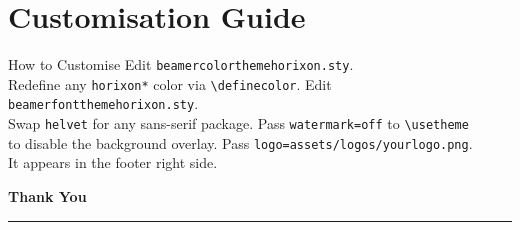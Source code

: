 \documentclass[aspectratio=169]{beamer}
\begin{document}
\horixonshowsepline

\section{Customisation Guide}

\horixonhidefooter

\begin{frame}{How to Customise}
  \columnsbegin[t]
        Edit \texttt{beamercolorthemehorixon.sty}.\\
        Redefine any \texttt{horixon*} color via \texttt{\textbackslash definecolor}.
      \blockend
        Edit \texttt{beamerfontthemehorixon.sty}.\\
        Swap \texttt{helvet} for any sans-serif package.
      \blockend
    \colend
        Pass \texttt{watermark=off} to \texttt{\textbackslash usetheme}\\
        to disable the background overlay.
      \blockend
        Pass \texttt{logo=assets/logos/yourlogo.png}.\\
        It appears in the footer right side.
      \blockend
    \colend
  \columnsend
\end{frame}

\horixonshowfooter

\begin{frame}[plain]
  \vfill
  \begin{center}
    {\large\color{horixoncream}\bfseries Thank You}\\[0.5em]
    \textcolor{horixonaccent}{\rule{5cm}{0.4pt}}\\[0.4em]
    {\small\color{horixonaccent}\insertauthor}\\
    {\footnotesize\color{horixoncream}\insertdate}
  \end{center}
  \vfill
\end{frame}
\end{document}

